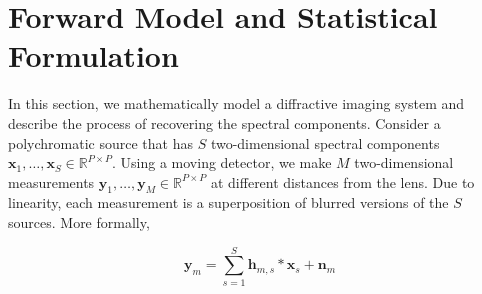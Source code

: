 \documentclass{article}
\begin{document}


\section{Forward Model and Statistical Formulation}
\label{sec:format}
In this section, we mathematically model a diffractive imaging system and
describe the process of recovering the spectral components. Consider a
polychromatic source that has $S$ two-dimensional spectral components $\bm{x}_1,
\dots, \bm{x}_S \in \mathbb R^{P \times P}$. Using a moving detector, we make
$M$ two-dimensional measurements $\bm{y}_1, \dots, \bm{y}_M \in \mathbb R^{P
\times P}$ at different distances from the lens.
Due to linearity, each measurement is a superposition of blurred versions of the
$S$ sources. More formally,

\begin{equation}
\bm{y}_m = \sum_{s=1}^S \bm{h}_{m,s} \ast \bm{x}_s + \bm{n}_m
\label{eq:fwd_model}
\end{equation}
\end{document}
